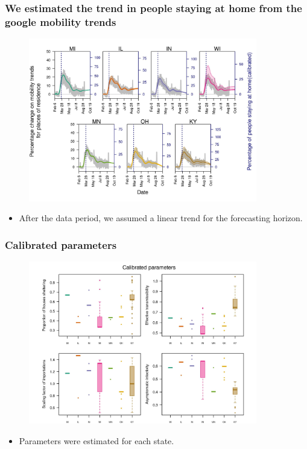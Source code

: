 \documentclass[usenames,dvipsnames]{beamer}
\begin{document}
\begin{frame}
  \frametitle{We estimated the trend in people staying at home from the google mobility trends}
  \begin{figure}
    \includegraphics[width=0.89\textwidth]{../figures/report_figure_shelter_patterns.jpeg}
  \end{figure}
  \begin{itemize}
  \item After the data period, we assumed a linear trend for the forecasting horizon. 
  \end{itemize}    
\end{frame}


\begin{frame}
  \frametitle{Calibrated parameters}
  \begin{figure}
    \includegraphics[width=0.89\textwidth]{../figures/report_figure_calibrated_parameters.jpeg}
  \end{figure}
  \begin{itemize}
  \item Parameters were estimated for each state.
  \end{itemize}    
\end{frame}
\end{document}
